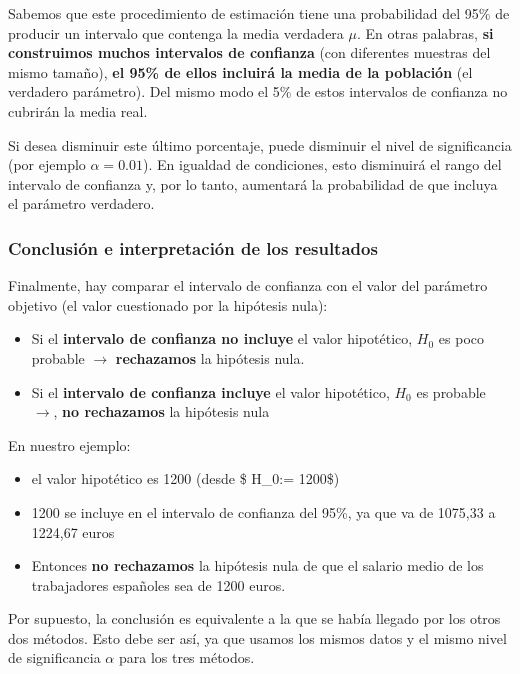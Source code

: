 \documentclass[
]{book}
\providecommand{\tightlist}{%
  \setlength{\itemsep}{0pt}\setlength{\parskip}{0pt}}
\begin{document}
Sabemos que este procedimiento de estimación tiene una probabilidad del 95\% de producir un intervalo que contenga la media verdadera \(\mu\). En otras palabras, \textbf{si construimos muchos intervalos de confianza} (con diferentes muestras del mismo tamaño), \textbf{el 95\% de ellos incluirá la media de la población} (el verdadero parámetro). Del mismo modo el 5\% de estos intervalos de confianza no cubrirán la media real.

Si desea disminuir este último porcentaje, puede disminuir el nivel de significancia (por ejemplo \(\alpha= 0.01\)). En igualdad de condiciones, esto disminuirá el rango del intervalo de confianza y, por lo tanto, aumentará la probabilidad de que incluya el parámetro verdadero.

\hypertarget{conclusiuxf3n-e-interpretaciuxf3n-de-los-resultados-1}{%
\subsubsection{Conclusión e interpretación de los resultados}\label{conclusiuxf3n-e-interpretaciuxf3n-de-los-resultados-1}}

Finalmente, hay comparar el intervalo de confianza con el valor del parámetro objetivo (el valor cuestionado por la hipótesis nula):

\begin{itemize}
\tightlist
\item
  Si el \textbf{intervalo de confianza no incluye} el valor hipotético, \(H_0\) es poco probable \(\rightarrow\) \textbf{rechazamos} la hipótesis nula.
\item
  Si el \textbf{intervalo de confianza incluye} el valor hipotético, \(H_0\) es probable \(\rightarrow\), \textbf{no rechazamos} la hipótesis nula
\end{itemize}

En nuestro ejemplo:

\begin{itemize}
\tightlist
\item
  el valor hipotético es 1200 (desde \$ H\_0:\mu= 1200\$)
\item
  1200 se incluye en el intervalo de confianza del 95\%, ya que va de 1075,33 a 1224,67 euros
\item
  Entonces \textbf{no rechazamos} la hipótesis nula de que el salario medio de los trabajadores españoles sea de 1200 euros.
\end{itemize}

Por supuesto, la conclusión es equivalente a la que se había llegado por los otros dos métodos. Esto debe ser así, ya que usamos los mismos datos y el mismo nivel de significancia \(\alpha\) para los tres métodos.
\end{document}
